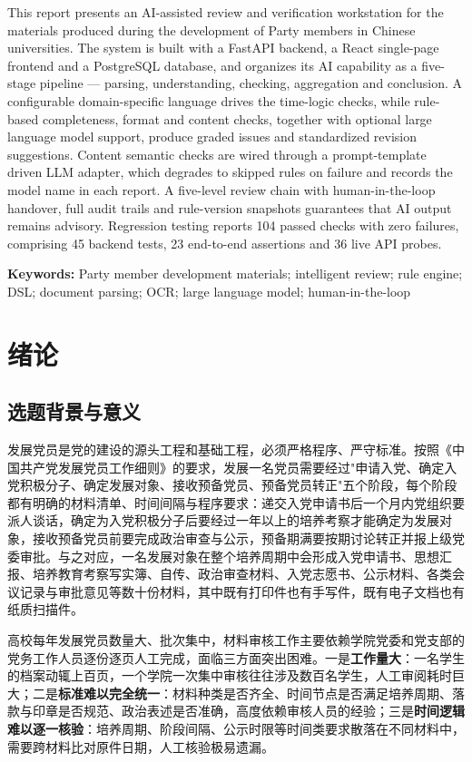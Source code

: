 \documentclass[12pt,a4paper]{ctexart}
\begin{document}
This report presents an AI-assisted review and verification workstation for the materials produced during the development of Party members in Chinese universities. The system is built with a FastAPI backend, a React single-page frontend and a PostgreSQL database, and organizes its AI capability as a five-stage pipeline --- parsing, understanding, checking, aggregation and conclusion. A configurable domain-specific language drives the time-logic checks, while rule-based completeness, format and content checks, together with optional large language model support, produce graded issues and standardized revision suggestions. Content semantic checks are wired through a prompt-template driven LLM adapter, which degrades to skipped rules on failure and records the model name in each report. A five-level review chain with human-in-the-loop handover, full audit trails and rule-version snapshots guarantees that AI output remains advisory. Regression testing reports 104 passed checks with zero failures, comprising 45 backend tests, 23 end-to-end assertions and 36 live API probes.

\vspace{0.6em}
\noindent\textbf{Keywords:} Party member development materials; intelligent review; rule engine; DSL; document parsing; OCR; large language model; human-in-the-loop

\clearpage
\section{绪论}

\subsection{选题背景与意义}

发展党员是党的建设的源头工程和基础工程，必须严格程序、严守标准。按照《中国共产党发展党员工作细则》的要求，发展一名党员需要经过"申请入党、确定入党积极分子、确定发展对象、接收预备党员、预备党员转正"五个阶段，每个阶段都有明确的材料清单、时间间隔与程序要求：递交入党申请书后一个月内党组织要派人谈话，确定为入党积极分子后要经过一年以上的培养考察才能确定为发展对象，接收预备党员前要完成政治审查与公示，预备期满要按期讨论转正并报上级党委审批。与之对应，一名发展对象在整个培养周期中会形成入党申请书、思想汇报、培养教育考察写实簿、自传、政治审查材料、入党志愿书、公示材料、各类会议记录与审批意见等数十份材料，其中既有打印件也有手写件，既有电子文档也有纸质扫描件。

高校每年发展党员数量大、批次集中，材料审核工作主要依赖学院党委和党支部的党务工作人员逐份逐页人工完成，面临三方面突出困难。一是\textbf{工作量大}：一名学生的档案动辄上百页，一个学院一次集中审核往往涉及数百名学生，人工审阅耗时巨大；二是\textbf{标准难以完全统一}：材料种类是否齐全、时间节点是否满足培养周期、落款与印章是否规范、政治表述是否准确，高度依赖审核人员的经验；三是\textbf{时间逻辑难以逐一核验}：培养周期、阶段间隔、公示时限等时间类要求散落在不同材料中，需要跨材料比对原件日期，人工核验极易遗漏。
\end{document}
